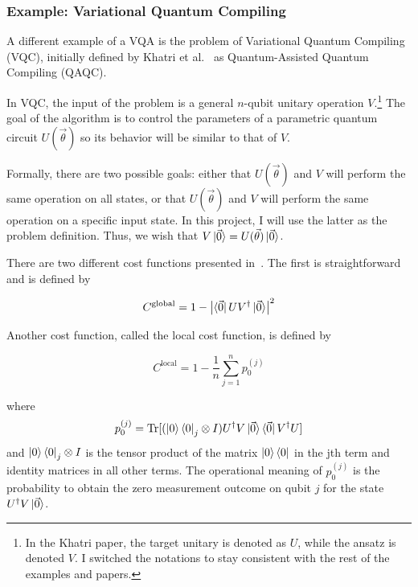 \documentclass[a4paper,12pt]{article}
\newcommand{\thetas}{\vec{\theta}}
\DeclareMathOperator{\tr}{Tr}
\begin{document}
\subsubsection{Example: Variational Quantum Compiling}
A different example of a VQA is the problem of Variational Quantum Compiling (VQC), initially defined by Khatri et al.~\cite{khatri_quantum-assisted_2019} as Quantum-Assisted Quantum Compiling (QAQC).

In VQC, the input of the problem is a general $n$-qubit unitary operation $V$.\footnote{In the Khatri paper, the target unitary is denoted as $U$, while the ansatz is denoted $V$. I switched the notations to stay consistent with the rest of the examples and papers.} The goal of the algorithm is to control the parameters of a parametric quantum circuit $U(\thetas)$ so its behavior will be similar to that of $V$.

Formally, there are two possible goals: either that $U(\thetas)$ and $V$ will perform the same operation on all states, or that $U(\thetas)$ and $V$ will perform the same operation on a specific input state.
In this project, I will use the latter as the problem definition. Thus, we wish that $V\ket{\vec{0}} = U(\thetas)\ket{\vec{0}}$.

There are two different cost functions presented in~\cite{khatri_quantum-assisted_2019}.
The first is straightforward and is defined by

\begin{equation}
    C^{\textrm{global}} = 1 - \left|\bra{\vec{0}}UV^\dagger\ket{\vec{0}}\right|^2
\end{equation}

Another cost function, called the local cost function, is defined by 

\begin{equation}
    C^{\textrm{local}} = 1 - \frac{1}{n} \sum_{j=1}^{n} p_0^{(j)}
\end{equation}

where
\begin{equation} \label{eqn:local_vqc_cost}
    p_0^{(j)} = \tr[({\ket{0}\bra{0}}_j \otimes I) U^\dagger V \ket{\vec{0}}\bra{\vec{0}} V^\dagger U]
\end{equation}
and ${\ket{0}\bra{0}}_j \otimes I$ is the tensor product of the matrix $\ket{0}\bra{0}$ in the jth term and identity matrices in all other terms.
The operational meaning of $p_0^{(j)}$ is the probability to obtain the zero measurement outcome on qubit $j$ for the state $U^\dagger V\ket{\vec{0}}$.
\end{document}
